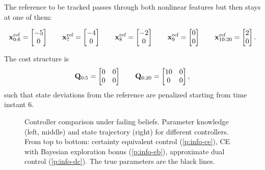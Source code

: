 The reference to be tracked passes through both nonlinear features but then
stays at one of them:
\begin{fullwidth}\vspace{-\baselineskip}
\begin{equation}
  \label{eq:exp4-trajectory}
  \mathbf{x}^\text{ref}_{0:6} = \begin{bmatrix} -5 \\ 0 \end{bmatrix}
  \qquad
  \mathbf{x}^\text{ref}_{7} = \begin{bmatrix} -4 \\ 0 \end{bmatrix}
  \qq
  \mathbf{x}^\text{ref}_{8} = \begin{bmatrix} -2 \\ 0 \end{bmatrix}
  \qq
  \mathbf{x}^\text{ref}_{9} = \begin{bmatrix} 0 \\ 0 \end{bmatrix}
  \qquad
  \mathbf{x}^\text{ref}_{10:20} = \begin{bmatrix} 2 \\ 0 \end{bmatrix}.
\end{equation}
\end{fullwidth}
The cost structure is
\begin{equation}
  \mathbf{Q}_{0:5} = \begin{bmatrix} 0 & 0 \\ 0 & 0 \end{bmatrix}
  \qquad
  \mathbf{Q}_{6:20} = \begin{bmatrix} 10 & 0 \\ 0 & 0 \end{bmatrix},
\end{equation}
such that state deviations from the reference are penalized starting from time
instant $6$.

\begin{figure*}
  \setlength\figureheight{6cm}
  \setlength\figurewidth{\columnwidth}
  \footnotesize
  \caption[Controller comparison under fading beliefs.]{Controller comparison
under fading beliefs. Parameter knowledge (left, middle) and state trajectory
(right) for different controllers. From top to bottom: certainty equivalent
control (\ref*{p:info-ce}), CE with Bayesian exploration bonus
(\ref*{p:info-eb}), approximate dual control (\ref*{p:info-dc}). The true
parameters are the black lines.}\label{fig:information-maintenance}
\end{figure*}

